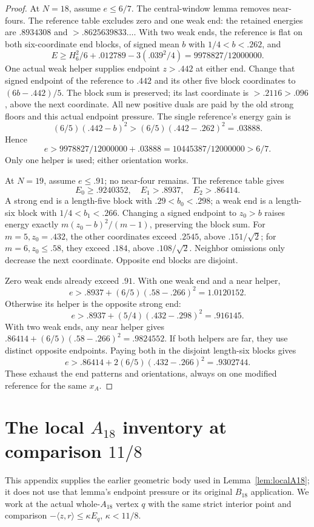 \documentclass[11pt]{article}
\theoremstyle{definition}
\theoremstyle{remark}
\newcommand{\ip}[2]{\langle #1,#2\rangle}
\begin{document}
\begin{proof}
At \(N=18\), assume \(e\leq6/7\).
The central-window lemma removes near-fours.
The reference table excludes zero and one weak end:
the retained energies are \(.8934308\) and
\(>.8625639833\ldots\).
With two weak ends, the reference is flat on both
six-coordinate end blocks, of signed mean \(b\)
with \(1/4<b<.262\), and
\[
 E\geq H_6^2/6+.012789-3(.039^2/4)
      =9978827/12000000.
\]
One actual weak helper supplies endpoint \(z>.442\)
at either end. Change that signed endpoint of the
reference to \(.442\) and its other five block
coordinates to \((6b-.442)/5\).
The block sum is preserved; its last coordinate
is \(>.2116>.096\), above the next coordinate.
All new positive duals are paid by the old
strong floors and this actual endpoint pressure.
The single reference's energy gain is
\[
 (6/5)(.442-b)^2>(6/5)(.442-.262)^2=.03888.
\]
Hence
\[
 e>9978827/12000000+.03888
   =10445387/12000000>6/7.
\]
Only one helper is used; either orientation works.

At \(N=19\), assume \(e\leq.91\); no near-four
remains. The reference table gives
\[
 E_0\geq.9240352,\quad E_1>.8937,\quad E_2>.86414.
\]
A strong end is a length-five block with
\(.29<b_0<.298\); a weak end is a length-six block
with \(1/4<b_1<.266\).
Changing a signed endpoint to \(z_0>b\)
raises energy exactly \(m(z_0-b)^2/(m-1)\),
preserving the block sum.
For \(m=5,z_0=.432\), the other coordinates
exceed \(.2545\), above \(.151/\sqrt2\);
for \(m=6,z_0\leq.58\), they exceed \(.184\),
above \(.108/\sqrt2\).
Neighbor omissions only decrease the next
coordinate. Opposite end blocks are disjoint.

Zero weak ends already exceed \(.91\).
With one weak end and a near helper,
\[
 e>.8937+(6/5)(.58-.266)^2=1.0120152.
\]
Otherwise its helper is the opposite strong end:
\[
 e>.8937+(5/4)(.432-.298)^2=.916145.
\]
With two weak ends, any near helper gives
\(.86414+(6/5)(.58-.266)^2=.9824552\).
If both helpers are far, they use distinct
opposite endpoints. Paying both in the disjoint
length-six blocks gives
\[
 e>.86414+2(6/5)(.432-.266)^2=.9302744.
\]
These exhaust the end patterns and orientations,
always on one modified reference for the same \(x_A\).
\end{proof}


\section[The local A18 inventory at comparison 11/8]{The local \(A_{18}\) inventory at comparison \(11/8\)}
\label{app:localAinputs}
This appendix supplies the earlier geometric body used in
Lemma~\ref{lem:localA18}; it does not use that lemma's
endpoint pressure or its original \(B_{18}\) application.
We work at the actual whole-\(A_{18}\) vertex \(q\)
with the same strict interior point and comparison
\(-\ip{z}{r}\leq\kappa E_q\), \(\kappa<11/8\).
\end{document}
